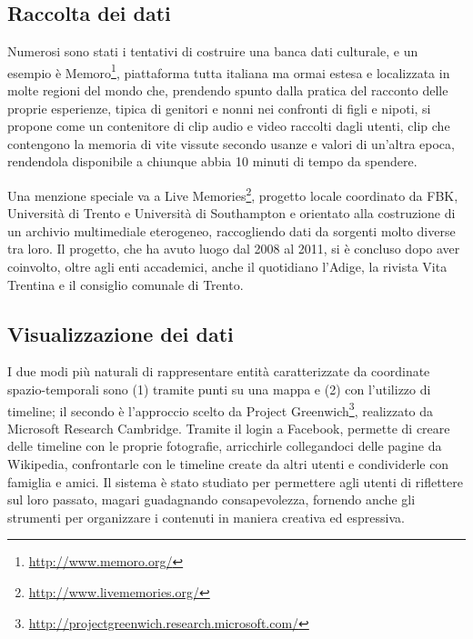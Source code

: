 \documentclass[sigproc-sp.tex]{subfiles}
\begin{document}
\subsection{Raccolta dei dati}
Numerosi sono stati i tentativi di costruire una banca dati culturale, e un esempio è Memoro\footnote{\url{http://www.memoro.org/}}, piattaforma tutta italiana ma ormai estesa e localizzata in molte regioni del mondo che, prendendo spunto dalla pratica del racconto delle proprie esperienze, tipica di genitori e nonni nei confronti di figli e nipoti, si propone come un contenitore di clip audio e video raccolti dagli utenti, clip che contengono la memoria di vite vissute secondo usanze e valori di un'altra epoca, rendendola disponibile a chiunque abbia 10 minuti di tempo da spendere.

Una menzione speciale va a Live Memories\footnote{\url{http://www.livememories.org/}}, progetto locale coordinato da FBK, Università di Trento e Università di Southampton e orientato alla costruzione di un archivio multimediale eterogeneo, raccogliendo dati da sorgenti molto diverse tra loro. Il progetto, che ha avuto luogo dal 2008 al 2011, si è concluso dopo aver coinvolto, oltre agli enti accademici, anche il quotidiano l’Adige, la rivista Vita Trentina e il consiglio comunale di Trento.

\subsection{Visualizzazione dei dati}
I due modi più naturali di rappresentare entità caratterizzate da coordinate spazio-temporali sono (1) tramite punti su una mappa e (2) con l’utilizzo di timeline; il secondo è l’approccio scelto da Project Greenwich\footnote{\url{http://projectgreenwich.research.microsoft.com/}}, realizzato da Microsoft Research Cambridge. Tramite il login a Facebook, permette di creare delle timeline con le proprie fotografie, arricchirle collegandoci delle pagine da Wikipedia, confrontarle con le timeline create da altri utenti e condividerle con famiglia e amici. Il sistema è stato studiato per permettere agli utenti di riflettere sul loro passato, magari guadagnando consapevolezza, fornendo anche gli strumenti per organizzare i contenuti in maniera creativa ed espressiva.
\end{document}
